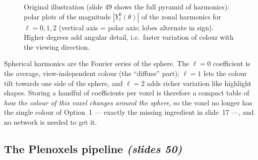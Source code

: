 \documentclass[11pt,a4paper]{article}
\newcommand{\sref}[1]{\texorpdfstring{\emph{(slides #1)}}{(slides #1)}}
\newcommand{\x}{{\bm{x}}}
\theoremstyle{definition}
\theoremstyle{plain}
\theoremstyle{remark}
\begin{document}
\begin{figure}[H]
\centering
{}
\caption{Original illustration (slide 49 shows the full pyramid of harmonics): polar plots of the magnitude $|Y_\ell^0(\theta)|$ of the zonal harmonics for $\ell=0,1,2$ (vertical axis = polar axis; lobes alternate in sign). Higher degrees add angular detail, i.e.\ faster variation of colour with the viewing direction.}
\end{figure}

\begin{intuition}
Spherical harmonics are the Fourier series of the sphere. The $\ell=0$ coefficient is the average, view-independent colour (the ``diffuse'' part); $\ell=1$ lets the colour tilt towards one side of the sphere, and $\ell=2$ adds richer variation like highlight shapes. Storing a handful of coefficients per voxel is therefore a compact table of \emph{how the colour of this voxel changes around the sphere}, so the voxel no longer has the single colour of Option~1 --- exactly the missing ingredient in slide~17 ---, and no network is needed to get it.
\end{intuition}

\subsection{The Plenoxels pipeline \sref{50}}
\end{document}
